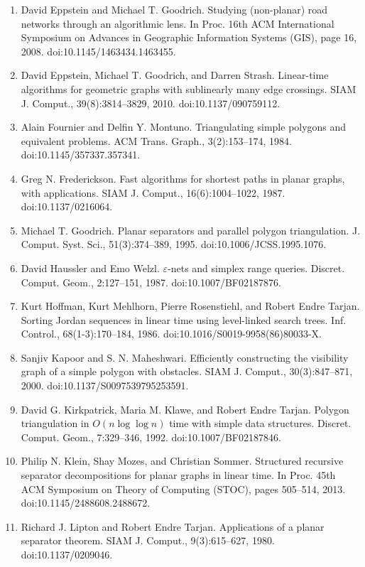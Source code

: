 \begin{enumerate}
\item[]  [12]  David Eppstein and Michael T. Goodrich.  Studying (non-planar) road networks through an algorithmic lens.  In Proc. 16th ACM International Symposium on Advances in Geographic Information Systems (GIS), page 16, 2008.  doi:10.1145/1463434.1463455.  
\item[]  [13]  David Eppstein, Michael T. Goodrich, and Darren Strash.  Linear-time algorithms for geometric graphs with sublinearly many edge crossings.  SIAM J. Comput., 39(8):3814–3829, 2010.  doi:10.1137/090759112.  
\item[]  [14]  Alain Fournier and Delfin Y. Montuno.  Triangulating simple polygons and equivalent problems.  ACM Trans. Graph., 3(2):153–174, 1984.  doi:10.1145/357337.357341.  
\item[]  [15]  Greg N. Frederickson.  Fast algorithms for shortest paths in planar graphs, with applications.  SIAM J. Comput., 16(6):1004–1022, 1987.  doi:10.1137/0216064.  
\item[]  [16]  Michael T. Goodrich.  Planar separators and parallel polygon triangulation.  J. Comput. Syst. Sci., 51(3):374–389, 1995.  doi:10.1006/JCSS.1995.1076.  
\item[]  [17]  David Haussler and Emo Welzl.  $\varepsilon$-nets and simplex range queries.  Discret. Comput. Geom., 2:127–151, 1987.  doi:10.1007/BF02187876.  
\item[]  [18]  Kurt Hoffman, Kurt Mehlhorn, Pierre Rosenstiehl, and Robert Endre Tarjan.  Sorting Jordan sequences in linear time using level-linked search trees.  Inf. Control., 68(1-3):170–184, 1986.  doi:10.1016/S0019-9958(86)80033-X.  
\item[]  [19]  Sanjiv Kapoor and S. N. Maheshwari.  Efficiently constructing the visibility graph of a simple polygon with obstacles.  SIAM J. Comput., 30(3):847–871, 2000.  doi:10.1137/S0097539795253591.  
\item[]  [20]  David G. Kirkpatrick, Maria M. Klawe, and Robert Endre Tarjan.  Polygon triangulation in $O(n\log\log n)$ time with simple data structures.  Discret. Comput. Geom., 7:329–346, 1992.  doi:10.1007/BF02187846.  
\item[]  [21]  Philip N. Klein, Shay Mozes, and Christian Sommer.  Structured recursive separator decompositions for planar graphs in linear time.  In Proc. 45th ACM Symposium on Theory of Computing (STOC), pages 505–514, 2013.  doi:10.1145/2488608.2488672.  
\item[]  [22]  Richard J. Lipton and Robert Endre Tarjan.  Applications of a planar separator theorem.  SIAM J. Comput., 9(3):615–627, 1980.  doi:10.1137/0209046.  

\end{enumerate}
